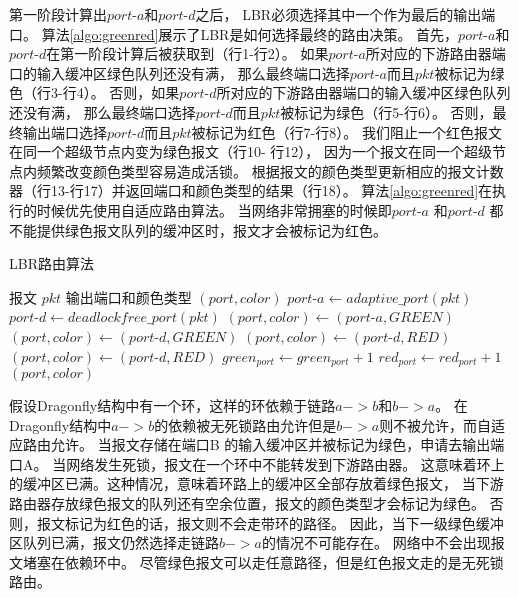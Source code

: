 第一阶段计算出$port\textrm{-}a$和$port\textrm{-}d$之后，
LBR必须选择其中一个作为最后的输出端口。
算法\ref{algo:greenred}展示了LBR是如何选择最终的路由决策。
首先，$port\textrm{-}a$和$port\textrm{-}d$在第一阶段计算后被获取到（行1-行2）。
如果$port\textrm{-}a$所对应的下游路由器端口的输入缓冲区绿色队列还没有满，
那么最终端口选择$port\textrm{-}a$而且$pkt$被标记为绿色（行3-行4）。
否则，如果$port\textrm{-}d$所对应的下游路由器端口的输入缓冲区绿色队列还没有满，
那么最终端口选择$port\textrm{-}d$而且$pkt$被标记为绿色（行5-行6）。
否则，最终输出端口选择$port\textrm{-}d$而且$pkt$被标记为红色（行7-行8）。
我们阻止一个红色报文在同一个超级节点内变为绿色报文（行10- 行12），
因为一个报文在同一个超级节点内频繁改变颜色类型容易造成活锁。
根据报文的颜色类型更新相应的报文计数器（行13-行17）并返回端口和颜色类型的结果（行18）。
算法\ref{algo:greenred}在执行的时候优先使用自适应路由算法。
当网络非常拥塞的时候即$port\textrm{-}a$ 和$port\textrm{-}d$
都不能提供绿色报文队列的缓冲区时，报文才会被标记为红色。

\begin{algorithm}[t]
  \centering
  \caption{LBR路由算法}
  \label{algo:greenred}
  \begin{algorithmic}[1]
    \REQUIRE 报文 $pkt$
    \ENSURE 输出端口和颜色类型 $(port, color)$
    \STATE $port\textrm{-}a \leftarrow adaptive\_port(pkt)$
    \STATE $port\textrm{-}d \leftarrow deadlockfree\_port(pkt)$
    \STATE $(port, color) \leftarrow (port\textrm{-}a, GREEN)$
    \STATE $(port, color) \leftarrow (port\textrm{-}d, GREEN)$
    \ELSE
    \STATE $(port, color) \leftarrow (port\textrm{-}d, RED)$
    \ENDIF
    \STATE $(port, color) \leftarrow (port\textrm{-}d, RED)$
    \ENDIF
    \STATE $green_{port} \leftarrow green_{port} + 1$
    \ELSE
    \STATE $red_{port} \leftarrow red_{port} + 1$
    \ENDIF
    \RETURN $(port, color)$
  \end{algorithmic}
\end{algorithm}

假设Dragonfly结构中有一个环，这样的环依赖于链路$a->b$和$b->a$。
在Dragonfly结构中$a->b$的依赖被无死锁路由允许但是$b->a$则不被允许，而自适应路由允许。
当报文存储在端口B 的输入缓冲区并被标记为绿色，申请去输出端口A。
当网络发生死锁，报文在一个环中不能转发到下游路由器。
这意味着环上的缓冲区已满。这种情况，意味着环路上的缓冲区全部存放着绿色报文，
当下游路由器存放绿色报文的队列还有空余位置，报文的颜色类型才会标记为绿色。
否则，报文标记为红色的话，报文则不会走带环的路径。
因此，当下一级绿色缓冲区队列已满，报文仍然选择走链路$b->a$的情况不可能存在。
网络中不会出现报文堵塞在依赖环中。
尽管绿色报文可以走任意路径，但是红色报文走的是无死锁路由。


